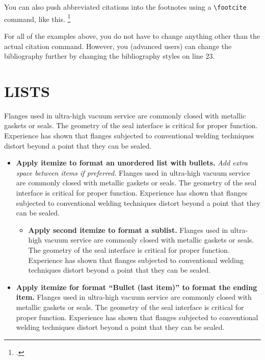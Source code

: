 \documentclass[tm]{ornltm} %
\begin{document}
You can also push abbreviated citations into the footnotes using a \verb|\footcite|
command, like this. \footcite{latexcompanion}

For all of the examples above, you do not have to change anything other than the
actual citation command. However, you (advanced users) can change the
bibliography further by changing the bibliography styles on line 23.


\section{LISTS}
\label{sec:lists}

Flanges used in ultra-high vacuum service are commonly closed with metallic
gaskets or seals. The geometry of the seal interface is critical for proper
function. Experience has shown that flanges subjected to conventional welding
techniques distort beyond a point that they can be sealed.
\vspace{12pt}

\begin{itemize}
  \item \textbf{Apply itemize to format an unordered list with bullets.}
    \emph{Add extra space between items if preferred.} Flanges used in
    ultra-high vacuum service are commonly closed with metallic gaskets or
    seals. The geometry of the seal interface is critical for proper function.
    Experience has shown that flanges subjected to conventional welding
    techniques distort beyond a point that they can be sealed.
	\begin{itemize}
    \item \textbf{Apply second itemize to format a sublist.} Flanges
      used in ultra-high vacuum service are commonly closed with metallic
      gaskets or seals. The geometry of the seal interface is critical for
      proper function. Experience has shown that flanges subjected to
      conventional welding techniques distort beyond a point that they can be
      sealed.
	\end{itemize}
  \item \textbf{Apply itemize for format ``Bullet (last item)'' to format the
    ending item.} Flanges used in ultra-high vacuum service are commonly closed
    with metallic gaskets or seals. The geometry of the seal interface is
    critical for proper function. Experience has shown that flanges subjected to
    conventional welding techniques distort beyond a point that they can be
    sealed.
\end{itemize}
\end{document}
